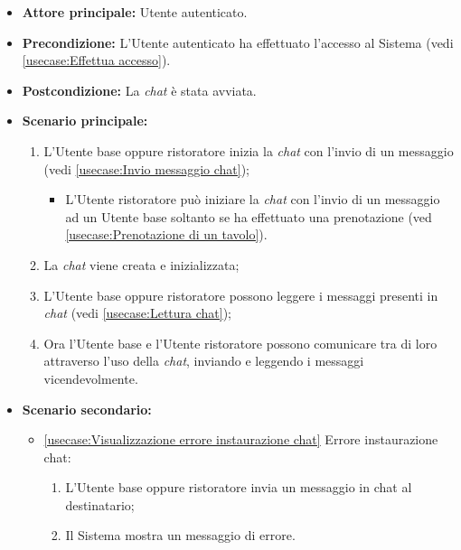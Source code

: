 \label{usecase:Comunicazione attraverso chat}
\begin{itemize}
	\item \textbf{Attore principale:} Utente autenticato.

	\item \textbf{Precondizione:} L'Utente autenticato ha effettuato l'accesso al Sistema (vedi \autoref{usecase:Effettua accesso}).

	\item \textbf{Postcondizione:} La \textit{chat} è stata avviata.

	\item \textbf{Scenario principale:}
            \begin{enumerate}
				\item L'Utente base oppure ristoratore inizia la \textit{chat} con l'invio di un messaggio (vedi \autoref{usecase:Invio messaggio chat});
                \begin{itemize}
					\item L'Utente ristoratore può iniziare la \textit{chat} con l'invio di un messaggio ad un Utente base soltanto se ha effettuato una prenotazione (ved \autoref{usecase:Prenotazione di un tavolo}).
				\end{itemize}
				\item La \textit{chat} viene creata e inizializzata;
				\item L'Utente base oppure ristoratore possono leggere i messaggi presenti in \textit{chat} (vedi \autoref{usecase:Lettura chat});
                \item Ora l'Utente base e l'Utente ristoratore possono comunicare tra di loro attraverso l'uso della \textit{chat}, inviando e leggendo i messaggi vicendevolmente.
	      \end{enumerate}

    \item \textbf{Scenario secondario:}
		  \begin{itemize}
			  \item \autoref{usecase:Visualizzazione errore instaurazione chat} Errore instaurazione chat:
				\begin{enumerate}
					\item L'Utente base oppure ristoratore invia un messaggio in chat al destinatario;
					\item Il Sistema mostra un messaggio di errore.
				\end{enumerate}
		  \end{itemize}
\end{itemize}

